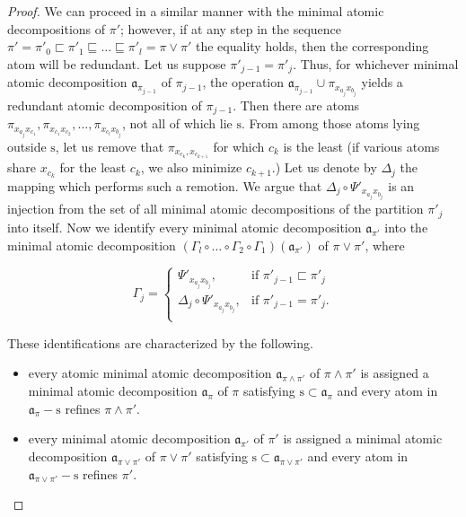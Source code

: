 \documentclass[12pt]{extarticle}
\begin{document}
\begin{proof}
		We can proceed in a similar manner with the minimal atomic decompositions of $\pi'$; however, if at any step in the sequence $\pi'=\pi'_0\sqsubset\pi'_1\sqsubseteq\dots\sqsubseteq\pi'_l=\pi\vee \pi'$ the equality holds, then the corresponding atom will be redundant. Let us suppose $\pi'_{j-1}=\pi'_{j}$. Thus, for whichever minimal atomic decomposition $\mathfrak{a}_{\pi_{j-1}}$ of $\pi_{j-1}$, the operation $\mathfrak{a}_{\pi_{j-1}}\cup \pi_{x_{a_j}x_{b_j}}$ yields a redundant atomic decomposition of $\pi_{j-1}$. Then there are atoms $\pi_{x_{a_j}x_{c_1}}, \pi_{x_{c_1}x_{c_2}}, \ldots, \pi_{x_{c_l}x_{b_j}}$, not all of which lie $\textrm{s}$. From among those atoms lying outside $\textrm{s}$, let us remove that $\pi_{x_{c_k},x_{c_{k+1}}}$ for which $c_k$ is the least (if various atoms share $x_{c_k}$ for the least $c_k$, we also minimize $c_{k+1}$.) Let us denote by $\Delta_j$ the mapping which performs such a remotion. We argue that $\Delta_j\circ\Psi'_{x_{a_j}x_{b_j}}$ is an injection from the set of all minimal atomic decompositions of the partition $\pi'_j$ into itself. Now we identify every minimal atomic decomposition $\mathfrak{a}_{\pi'}$ into the minimal atomic decomposition $\left(\Gamma_{l}\circ\ldots \circ\Gamma_{2}\circ\Gamma_{1}\right) (\mathfrak{a}_{\pi'})$ of $\pi\vee\pi'$, where   
		
		\[
		\Gamma_j = \left\{\begin{array}{lr}
		\Psi'_{x_{a_j}x_{b_j}}, & \text{if } \pi'_{j-1}\sqsubset\pi'_{j}\\
		\Delta_j\circ\Psi'_{x_{a_j}x_{b_j}}, & \text{if } \pi'_{j-1}=\pi'_{j}.\\
		\end{array}\right.
		\]
		
		These identifications are characterized by the following.
		\begin{itemize}
			\item every atomic minimal atomic decomposition $\mathfrak{a}_{\pi\wedge\pi'}$ of $\pi\wedge\pi'$ is assigned a minimal atomic decomposition $\mathfrak{a}_{\pi}$ of $\pi$ satisfying $\textrm{s} \subset\mathfrak{a}_{\pi}$  and every atom in $\mathfrak{a}_{\pi}-\textrm{s}$ refines $\pi\wedge\pi'$.
			\item every minimal atomic decomposition $\mathfrak{a}_{\pi'}$ of $\pi'$ is assigned a
		 minimal atomic decomposition $\mathfrak{a}_{\pi\vee\pi'}$ of $\pi\vee\pi'$ satisfying $\textrm{s} \subset\mathfrak{a}_{\pi\vee\pi'}$  and every atom in $\mathfrak{a}_{\pi\vee\pi'}-\textrm{s}$ refines $\pi'$.
		\end{itemize}
		

\end{proof}
\end{document}
